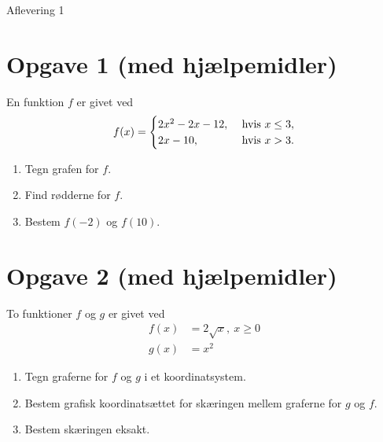 

\begin{center}
\Huge
Aflevering 1
\end{center}
\section*{Opgave 1 \large (med hjælpemidler)}
En funktion $f$ er givet ved 
\begin{align*}
f(x) = \begin{cases}
2x^2-2x-12, &\textnormal{ hvis } x\leq 3,\\
2x-10, &\textnormal{ hvis } x>3.
\end{cases}
\end{align*}
\begin{enumerate}[label=\roman*)]
\item Tegn grafen for $f$.
\item Find rødderne for $f$.
\item Bestem $f(-2)$ og $f(10)$.
\end{enumerate}

\section*{Opgave 2 \large (med hjælpemidler)}
To funktioner $f$ og $g$ er givet ved
\begin{align*}
f(x) &= 2\sqrt{x}, \ x\geq 0\\
g(x) &= x^2
\end{align*}
\begin{enumerate}[label=\roman*)]
\item Tegn graferne for $f$ og $g$ i et koordinatsystem.
\item Bestem grafisk koordinatsættet for skæringen mellem graferne for $g$ og $f$. 
\item Bestem skæringen eksakt. 
\end{enumerate}

